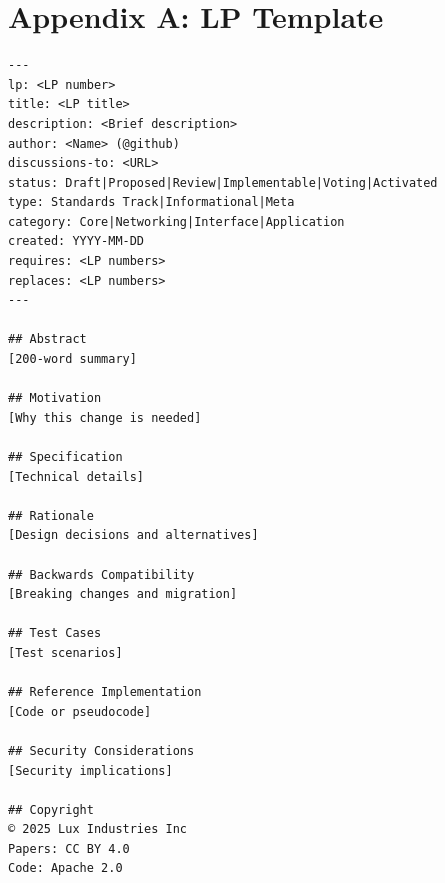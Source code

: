 \section*{Appendix A: LP Template}


\begin{verbatim}
---
lp: <LP number>
title: <LP title>
description: <Brief description>
author: <Name> (@github)
discussions-to: <URL>
status: Draft|Proposed|Review|Implementable|Voting|Activated
type: Standards Track|Informational|Meta
category: Core|Networking|Interface|Application
created: YYYY-MM-DD
requires: <LP numbers>
replaces: <LP numbers>
---

## Abstract
[200-word summary]

## Motivation
[Why this change is needed]

## Specification
[Technical details]

## Rationale
[Design decisions and alternatives]

## Backwards Compatibility
[Breaking changes and migration]

## Test Cases
[Test scenarios]

## Reference Implementation
[Code or pseudocode]

## Security Considerations
[Security implications]

## Copyright
© 2025 Lux Industries Inc
Papers: CC BY 4.0
Code: Apache 2.0
\end{verbatim}

